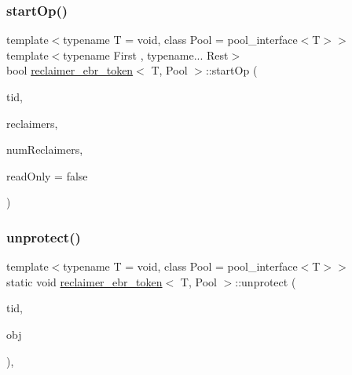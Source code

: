 \mbox{\label{classreclaimer__ebr__token_ae945b650a83590e6973db21404a2fb6a}} 
\subsubsection{\texorpdfstring{start\+Op()}{startOp()}}
{\footnotesize\ttfamily template$<$typename T  = void, class Pool  = pool\+\_\+interface$<$\+T$>$$>$ \\
template$<$typename First , typename... Rest$>$ \\
bool \hyperlink{classreclaimer__ebr__token}{reclaimer\+\_\+ebr\+\_\+token}$<$ T, Pool $>$\+::start\+Op (\begin{DoxyParamCaption}\item[{const int}]{tid,  }\item[{void $\ast$const $\ast$const}]{reclaimers,  }\item[{const int}]{num\+Reclaimers,  }\item[{const bool}]{read\+Only = {\ttfamily false} }\end{DoxyParamCaption})\hspace{0.3cm}{\ttfamily [inline]}}

\mbox{\label{classreclaimer__ebr__token_aa43f00d8adc9cefeb604c14f0af45083}} 
\subsubsection{\texorpdfstring{unprotect()}{unprotect()}}
{\footnotesize\ttfamily template$<$typename T  = void, class Pool  = pool\+\_\+interface$<$\+T$>$$>$ \\
static void \hyperlink{classreclaimer__ebr__token}{reclaimer\+\_\+ebr\+\_\+token}$<$ T, Pool $>$\+::unprotect (\begin{DoxyParamCaption}\item[{const int}]{tid,  }\item[{T $\ast$const}]{obj }\end{DoxyParamCaption})\hspace{0.3cm}{\ttfamily [inline]}, {\ttfamily [static]}}



